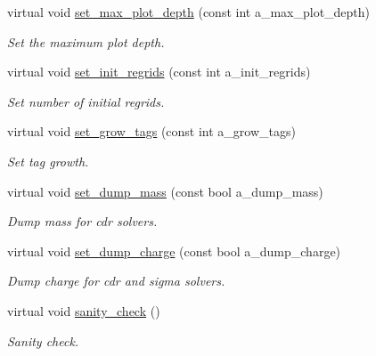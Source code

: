 \begin{DoxyCompactItemize}
virtual void \hyperlink{classplasma__engine_aa9f1f590fe23eef47acdc47020bb52da}{set\+\_\+max\+\_\+plot\+\_\+depth} (const int a\+\_\+max\+\_\+plot\+\_\+depth)
\begin{DoxyCompactList}\small\item\em Set the maximum plot depth. \end{DoxyCompactList}\item 
virtual void \hyperlink{classplasma__engine_abbde563745b8e34265915dab3ec4bd38}{set\+\_\+init\+\_\+regrids} (const int a\+\_\+init\+\_\+regrids)
\begin{DoxyCompactList}\small\item\em Set number of initial regrids. \end{DoxyCompactList}\item 
virtual void \hyperlink{classplasma__engine_ab4ca62fcbf0e30c40cc89a40c670bf92}{set\+\_\+grow\+\_\+tags} (const int a\+\_\+grow\+\_\+tags)
\begin{DoxyCompactList}\small\item\em Set tag growth. \end{DoxyCompactList}\item 
virtual void \hyperlink{classplasma__engine_a724021f3241d58c68ca7028ac393b674}{set\+\_\+dump\+\_\+mass} (const bool a\+\_\+dump\+\_\+mass)
\begin{DoxyCompactList}\small\item\em Dump mass for cdr solvers. \end{DoxyCompactList}\item 
virtual void \hyperlink{classplasma__engine_a6db9fb70a497250ccbaa427a86ac83e3}{set\+\_\+dump\+\_\+charge} (const bool a\+\_\+dump\+\_\+charge)
\begin{DoxyCompactList}\small\item\em Dump charge for cdr and sigma solvers. \end{DoxyCompactList}\item 
virtual void \hyperlink{classplasma__engine_a10af946b51b86a92476ae3e4f6a28ebe}{sanity\+\_\+check} ()
\begin{DoxyCompactList}\small\item\em Sanity check. \end{DoxyCompactList}\end{DoxyCompactItemize}
